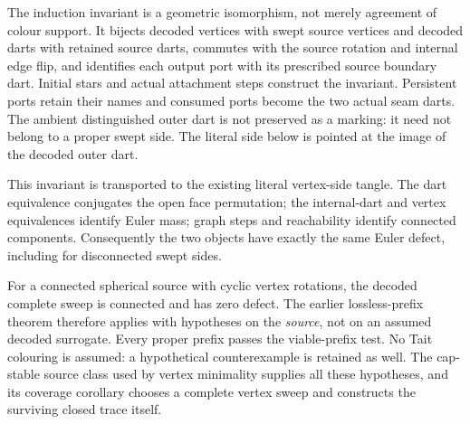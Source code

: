 The induction invariant is a geometric isomorphism, not merely agreement of
colour support. It bijects decoded vertices with swept source vertices and
decoded darts with retained source darts, commutes with the source rotation
and internal edge flip, and identifies each output port with its prescribed
source boundary dart. Initial stars and actual attachment steps construct
the invariant. Persistent ports retain their names and consumed ports become
the two actual seam darts. The ambient distinguished outer dart is not
preserved as a marking: it need not belong to a proper swept side. The
literal side below is pointed at the image of the decoded outer dart.

This invariant is transported to the existing literal vertex-side tangle.
The dart equivalence conjugates the open face permutation; the internal-dart
and vertex equivalences identify Euler mass; graph steps and reachability
identify connected components. Consequently the two objects have exactly the
same Euler defect, including for disconnected swept sides.

For a connected spherical source with cyclic vertex rotations, the decoded
complete sweep is connected and has zero defect. The earlier lossless-prefix
theorem therefore applies with hypotheses on the \emph{source}, not on an
assumed decoded surrogate. Every proper prefix passes the viable-prefix
test. No Tait colouring is assumed: a hypothetical counterexample is retained
as well. The cap-stable source class used by vertex minimality supplies all
these hypotheses, and its coverage corollary chooses a complete vertex sweep
and constructs the surviving closed trace itself.

